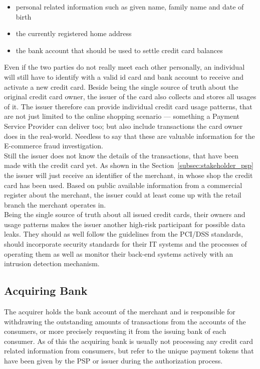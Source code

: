 \begin{itemize}
		\item personal related information such as given name, family name and date of birth
		\item the currently registered home address
		\item the bank account that should be used to settle credit card balances
\end{itemize}

Even if the two parties do not really meet each other personally, an individual will still have to identify with a valid id card and bank account to receive and activate a new credit card. Beside being the single source of truth about the original credit card owner, the issuer of the card also collects and stores all  usages of it. The issuer therefore can provide individual credit card usage patterns, that are not just limited to the online shopping scenario --- something a Payment Service Provider can deliver too; but also include transactions the card owner does in the real-world. Needless to say that these are valuable information for the \gls{E-commerce} fraud investigation. \\

Still the issuer does not know the details of the transactions, that have been made with the credit card yet. As shown in the Section~\ref{subsec:stakeholder_psp} the issuer will just receive an identifier of the merchant, in whose shop the credit card has been used. Based on public available information from a commercial register about the merchant, the issuer could at least come up with the retail branch the merchant operates in. \\

Being the single source of truth about all issued credit cards, their owners and usage patterns makes the issuer another high-risk participant for possible data leaks. They should as well follow the guidelines from the \gls{PCI/DSS} standards, should incorporate security standards for their \gls{IT} systems and the processes of operating them as well as monitor their back-end systems actively with an intrusion detection mechanism.


\subsection{Acquiring Bank}
\label{subsec:stakeholder_acquirer}

The acquirer holds the bank account of the merchant and is responsible for withdrawing the outstanding amounts of transactions from the accounts of the consumers, or more precisely requesting it from the issuing bank of each consumer. As of this the acquiring bank is usually not processing any credit card related information from consumers, but refer to the unique payment tokens that have been given by the \gls{PSP} or issuer during the authorization process. \\


